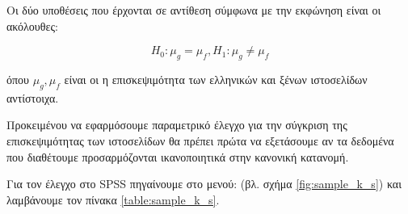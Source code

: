 \documentclass{assignment}
\begin{document}
\begin{Assignment}[Μέρος Β]

Οι δύο υποθέσεις που έρχονται σε αντίθεση σύμφωνα με την εκφώνηση είναι οι ακόλουθες:

\begin{equation}
H_0 : \mu_g = \mu_f, H_1: \mu_g \neq \mu_f
\end{equation}

όπου $ \mu_g, \mu_f $ είναι οι η επισκεψιμότητα των ελληνικών και ξένων ιστοσελίδων αντίστοιχα.

Προκειμένου να εφαρμόσουμε παραμετρικό έλεγχο για την σύγκριση της επισκεψιμότητας των ιστοσελίδων θα πρέπει πρώτα να εξετάσουμε αν τα δεδομένα που διαθέτουμε προσαρμόζονται ικανοποιητικά στην κανονική κατανομή. 

Για τον έλεγχο στο SPSS πηγαίνουμε στο μενού:  (βλ. σχήμα \ref{fig:sample_k_s}) και λαμβάνουμε τον πίνακα \ref{table:sample_k_s}. 



\end{Assignment}
\end{document}
